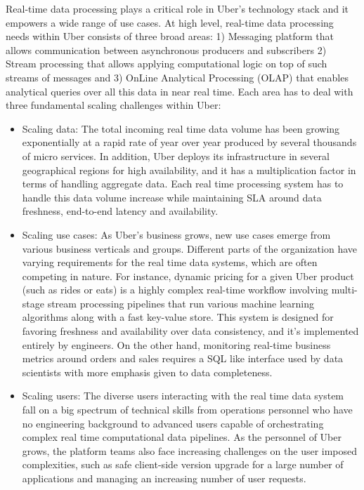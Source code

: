 \documentclass[sigconf]{acmart}
\begin{document}
Real-time data processing plays a critical role in Uber’s technology stack and it empowers a wide range of use cases. At high level, real-time data processing needs within Uber consists of three broad areas: 1) Messaging platform that allows communication between asynchronous producers and subscribers 2) Stream processing that allows applying computational logic on top of such streams of messages and 3) OnLine Analytical Processing (OLAP) that enables analytical queries over all this data in near real time. Each area has to deal with three fundamental scaling challenges within Uber:

\begin{itemize}
\item Scaling data: The total incoming real time data volume has been growing exponentially at a rapid rate of year over year produced by several thousands of micro services. In addition, Uber deploys its infrastructure in several geographical regions for high availability, and it has a multiplication factor in terms of handling aggregate data. Each real time processing system has to handle this data volume increase while maintaining SLA around data freshness, end-to-end latency and availability.

\item Scaling use cases: As Uber’s business grows, new use cases emerge from various business verticals and groups. Different parts of the organization have varying requirements for the real time data systems, which are often competing in nature. For instance, dynamic pricing\cite{chen2016dynamic} for a given Uber product (such as rides or eats) is a highly complex real-time workflow involving multi-stage stream processing pipelines that run various machine learning algorithms along with a fast key-value store. This system is designed for favoring freshness and availability over data consistency, and it’s implemented entirely by engineers. On the other hand, monitoring real-time business metrics around orders and sales requires a SQL like interface used by data scientists with more emphasis given to data completeness. 

\item Scaling users: The diverse users interacting with the real time data system fall on a big spectrum of technical skills from operations personnel who have no engineering background to advanced users capable of orchestrating complex real time computational data pipelines. As the personnel of Uber grows, the platform teams also face increasing challenges on the user imposed complexities, such as safe client-side version upgrade for a large number of applications and managing an increasing number of user requests.

\end{itemize}
\end{document}
